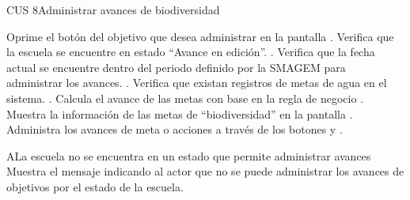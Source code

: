 \begin{UseCase}{CUS 8}{Administrar avances de biodiversidad}
\end{UseCase}

 \begin{UCtrayectoria}
    \UCpaso[\UCactor] Oprime el botón \botAcciones del objetivo que desea administrar en la pantalla .\label{cus8:oprimeAvance}
    \UCpaso[\UCsist] Verifica que la escuela se encuentre en estado ``Avance en edición''. .
    \UCpaso[\UCsist] Verifica que la fecha actual se encuentre dentro del periodo definido por la SMAGEM para administrar los avances. .
    \UCpaso[\UCsist] Verifica que existan registros de metas de agua en el sistema. .
    \UCpaso[\UCsist] Calcula el avance de las metas con base en la regla de negocio .
     \UCpaso[\UCsist] Muestra la información de las metas de ``biodiversidad'' en la pantalla .
     \UCpaso[\UCactor] Administra los avances de meta o acciones a través de los botones \botAutoAjus y \botMetas. \label{cus8:Administrar}
 \end{UCtrayectoria}

 \begin{UCtrayectoriaA}{A}{La escuela no se encuentra en un estado que permite administrar avances}
    \UCpaso[\UCactor] Muestra el mensaje  indicando al actor que no se puede administrar los avances de objetivos por el estado de la escuela.
 \end{UCtrayectoriaA}

